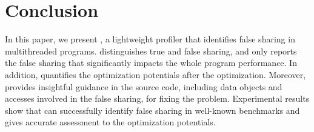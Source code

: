 \section{Conclusion}
\label{sec:conclusion}

In this paper, we present \cheetah{}, a lightweight profiler that identifies false sharing in multithreaded programs. \cheetah{} distinguishes true and false sharing, and only reports the false sharing that significantly impacts the whole program performance. In addition, \cheetah{} quantifies the optimization potentials after the optimization. Moreover, \cheetah{} provides insightful guidance in the source code, including data objects and accesses involved in the false sharing, for fixing the problem. Experimental results show that \cheetah{} can successfully identify false sharing in well-known benchmarks and gives accurate assessment to the optimization potentials.


